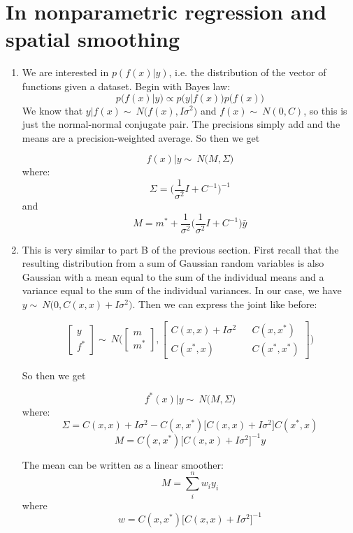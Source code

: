 \documentclass[10pt]{article}
\begin{document}
    \section{In nonparametric regression and spatial smoothing}
    \begin{enumerate}[label=(\Alph*)]
    \item
    We are interested in $p(f(x)|y)$, i.e. the distribution of the vector of functions given a dataset. Begin with Bayes law:
    $$p\bigg(f(x)|y\bigg) \propto p\bigg(y|f(x)\bigg)p\bigg(f(x)\bigg)$$
    We know that $y|f(x) \sim\ N\big(f(x), I\sigma^2\big)$ and $f(x) \sim\ N(0, C)$, so this is just the normal-normal conjugate pair. The precisions simply add and the means are a precision-weighted average. So then we get
    
    $$f(x)|y \sim\ N\bigg(M, \Sigma\bigg) $$
    where:
    $$\Sigma = \big(\frac{1}{\sigma^2}I + C^{-1}\big)^{-1}$$
    and 
    $$ M = m^* + \frac{1}{\sigma^2}\big(\frac{1}{\sigma^2}I + C^{-1}\big)\bar{y}$$
    
    \item
    This is very similar to part B of the previous section. First recall that the resulting distribution from a sum of Gaussian random variables is also Gaussian with a mean equal to the sum of the individual means and a variance equal to the sum of the individual variances. In our case, we have $y \sim\ N\bigg(0, C(x,x) + I\sigma^2 \bigg) $. Then we can express the joint like before:
    
    $$\begin{bmatrix}y \\ f^* \end{bmatrix} \sim\ N\bigg(\begin{bmatrix} m \\ m^* \end{bmatrix}, 
    \begin{bmatrix} C(x,x) + I\sigma^2 && C(x,x^*) \\ C(x^*, x) && C(x^*, x^*)    \end{bmatrix}\bigg)$$
    
    So then we get
    
    $$f^*(x)|y \sim\ N\bigg(M, \Sigma\bigg) $$
    where:
    $$\Sigma=C(x,x) + I\sigma^2 - C(x,x^*)\big[C(x,x) + I\sigma^2\big]C(x^*,x)$$
    $$ M = C(x,x^*)\big[C(x,x) + I\sigma^2]^{-1}y$$
    
    The mean can be written as a linear smoother:
    $$M = \sum_{i}^{n} w_iy_i$$
    where 
    $$w = C(x,x^*)\big[C(x,x) + I\sigma^2]^{-1}$$
    

\end{enumerate}
\end{document}
